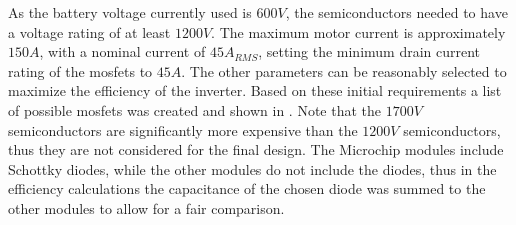 As the battery voltage currently used is $600V$, the semiconductors needed to have a voltage rating of at least $1200V$. The maximum motor current is approximately $150A$, with a nominal current of $45A_{RMS}$, setting the minimum drain current rating of the \glspl{mosfet} to $45A$. The other parameters can be reasonably selected to maximize the efficiency of the inverter. Based on these initial requirements a list of possible \glspl{mosfet} was created and shown in . Note that the $1700V$ semiconductors are significantly more expensive than the $1200V$ semiconductors, thus they are not considered for the final design.  The Microchip modules include Schottky diodes, while the other modules do not include the diodes, thus in the efficiency calculations the capacitance of the chosen diode was summed to the other modules to allow for a fair comparison.


